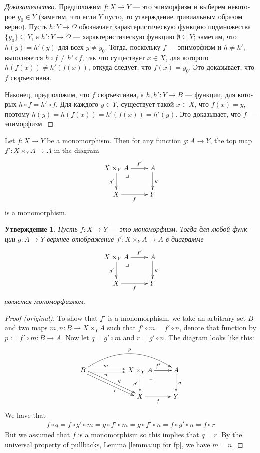 \documentclass[a4paper]{book}
\makeatletter
\def\to{\rightarrow}
\def\taking{\colon}
\def\ss{\subseteq}
\def\ullimit{\ar@{}[rd]|(.3)*+{\lrcorner}}
\theoremstyle{myth}
\newtheorem{propositionENG}[envENG]{\begin{english}Proposition\end{english}}
\newenvironment{proofENG}{\begin{proof}[Proof (original)]}{\end{proof}}
\newtheorem{propositionRUS}[envRUS]{Утверждение}
\newenvironment{proofRUS}{\begin{proof}[Доказательство]}{\end{proof}}
\makeatother
\begin{document}
\begin{russian}
\begin{proofRUS}
Предположим $f\taking X\to Y$ — это эпиморфизм и выберем некоторое $y_0\in Y$ (заметим, что если $Y$ пусто, то утверждение тривиальным образом верно). Пусть $h\taking Y\to\Omega$ обозначает характеристическую функцию подмножества $\{y_0\}\ss Y$, а $h'\taking Y\to\Omega$ — характеристическую функцию $\emptyset\ss Y$; заметим, что $h(y)=h'(y)$ для всех $y\neq y_0$. Тогда, поскольку $f$ — эпиморфизм и $h\neq h'$, выполняется $h\circ f\neq h'\circ f$, так что существует $x\in X$, для которого $h(f(x))\neq h'(f(x))$, откуда следует, что $f(x)=y_0$. Это доказывает, что $f$ сюръективна.

Наконец, предположим, что $f$ сюръективна, а $h,h'\taking Y\to B$ — функции, для которых $h\circ f=h'\circ f$. Для каждого $y\in Y$, существует такой $x\in X$, что $f(x)=y$, поэтому $h(y)=h(f(x))=h'(f(x))=h'(y)$. Это доказывает, что $f$ — эпиморфизм.
\end{proofRUS}

\begin{propositionENG}\label{prop:pb preserve mono}
Let $f\taking X\to Y$ be a monomorphism. Then for any function $g\taking A\to Y$, the top map $f'\taking X\times_YA\to A$ in the diagram
$$
\xymatrix{X\times_YA\ar[r]^-{f'}\ar[d]_{g'}\ullimit&A\ar[d]^g\\X\ar[r]_f&Y}
$$
is a monomorphism.
\end{propositionENG}

\begin{propositionRUS}\label{prop:pb preserve mono}
Пусть $f\taking X\to Y$ — это мономорфизм. Тогда для любой функции $g\taking A\to Y$ верхнее отображение $f'\taking X\times_YA\to A$ в диаграмме
$$
\xymatrix{X\times_YA\ar[r]^-{f'}\ar[d]_{g'}\ullimit&A\ar[d]^g\\X\ar[r]_f&Y}
$$
является мономорфизмом.
\end{propositionRUS}

\begin{proofENG}
To show that $f'$ is a monomorphism, we take an arbitrary set $B$ and two maps $m,n\taking B\to X\times_YA$ such that $f'\circ m=f'\circ n$, denote that function by $p:=f'\circ m\taking B\to A$. Now let $q=g'\circ m$ and $r=g'\circ n$. The diagram looks like this:
$$
\xymatrix{B\ar@<.5ex>[rr]^(.4)m\ar@<-.5ex>[rr]_(.4)n\ar@/^2pc/[rrr]^p\ar@<.5ex>[drr]^(.6)q\ar@<-.5ex>[drr]_(.6)r&&X\times_YA\ar[r]^{f'}\ar[d]_{g'}\ullimit&A\ar[d]^g\\&&X\ar[r]_f&Y}
$$
We have that 
\begin{align*}f\circ q=f\circ g'\circ m=g\circ f'\circ m=g\circ f'\circ n=f\circ g'\circ n=f\circ r\end{align*} 
But we assumed that $f$ is a monomorphism so this implies that $q=r$. By the universal property of pullbacks, Lemma \ref{lemma:up for fp}, we have $m=n$.
\end{proofENG}


\end{russian}
\end{document}
